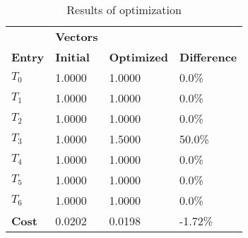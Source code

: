 \begin{table}[h!]
\centering
\begin{tabular}{llll}
\textbf{}      & \cellcolor[HTML]{EFEFEF}\textbf{Vectors} & \textbf{} & \textbf{}         \\
\rowcolor[HTML]{EFEFEF} 
\textbf{Entry} & \textbf{Initial} & \textbf{Optimized} & \textbf{Difference} \\
$T_0$ & 1.0000 & 1.0000 & 0.0\% \\ 
$T_1$ & 1.0000 & 1.0000 & 0.0\% \\ 
$T_2$ & 1.0000 & 1.0000 & 0.0\% \\ 
$T_3$ & 1.0000 & 1.5000 & 50.0\% \\ 
$T_4$ & 1.0000 & 1.0000 & 0.0\% \\ 
$T_5$ & 1.0000 & 1.0000 & 0.0\% \\ 
$T_6$ & 1.0000 & 1.0000 & 0.0\% \\ 
\rowcolor[HTML]{EFEFEF} 
\textbf{Cost}  & 0.0202 & 0.0198 & -1.72\% \\ 
\end{tabular}
\caption{Results of optimization}
\label{tab:OptimizationAnalysis}
\end{table}